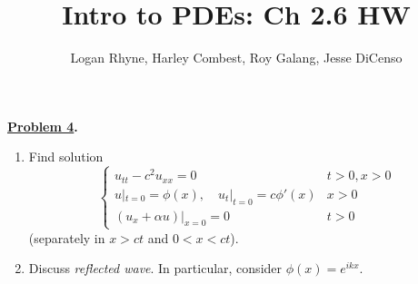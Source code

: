 \documentclass{article}
\title{Intro to PDEs: Ch 2.6 HW}
\author{Logan Rhyne, Harley Combest, Roy Galang, Jesse DiCenso}
\theoremstyle{definition}
\newenvironment{boldenv}{\bfseries\boldmath}{}
\begin{document}
	
    \maketitle

\begin{boldenv}
    \underline{Problem 4}. \begin{enumerate}
        \item Find solution
        \[\begin{cases}
            u_{tt} - c^2u_{xx} = 0 & t > 0, x > 0\\
            u|_{t=0} = \phi(x),\quad u_t|_{t=0} = c\phi'(x) & x > 0\\
            (u_x + \alpha u)|_{x=0} = 0 & t > 0
        \end{cases}\]
        (separately in $x > ct$ and $0 < x < ct$).

        \item Discuss \textit{reflected wave}. In particular, consider $\phi(x) = e^{ikx}$.
    \end{enumerate}
\end{boldenv}
\end{document}
